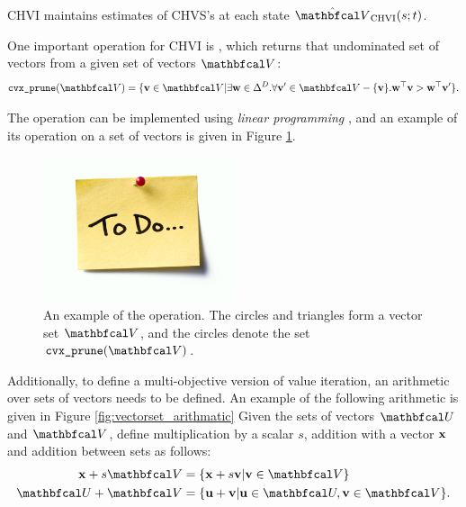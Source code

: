         CHVI maintains estimates of CHVS's at each state $\Vchvi(s;t)$.

        One important operation for CHVI is \cprune, which returns that undominated set of vectors from a given set of vectors $\bfcl{V}$:
        \begin{align}
            \cprune(\bfcl{V}) = \{\bff{v}\in\bfcl{V} | \exists \bff{w}\in\Delta^D. \forall \bff{v}'\in\bfcl{V}-\{\bff{v}\}. \bff{w}^\top \bff{v} > \bff{w}^\top \bff{v}' \}.
        \end{align}

        The \cprune\ewe operation can be implemented using \textit{linear programming} , and an example of its operation on a set of vectors is given in Figure \ref{fig:convex_prune}.

        \begin{figure}
            \centering\includegraphics[width=0.5\textwidth]{figures/todo.jpg} 
            \caption[An example of the \cprune\ewe operation.]{An example of the \cprune\ewe operation. The circles and triangles form a vector set $\bfcl{V}$, and the circles denote the set $\cprune(\bfcl{V})$.}
            \label{fig:convex_prune}
        \end{figure}

        Additionally, to define a multi-objective version of value iteration, an arithmetic over sets of vectors needs to be defined. An example of the following arithmetic is given in Figure \ref{fig:vectorset_arithmatic} Given the sets of vectors $\bfcl{U}$ and $\bfcl{V}$, define multiplication by a scalar $s$, addition with a vector $\mathbf{x}$ and addition between sets as follows:
        \begin{align}
            \bff{x} + s\bfcl{V} &= \{\bff{x} + s\bff{v} | \bff{v}\in\bfcl{V} \} \\
            \bfcl{U} + \bfcl{V} &= \{ \bff{u}+\bff{v} | \bff{u}\in\bfcl{U}, \bff{v}\in\bfcl{V} \}.
        \end{align}

